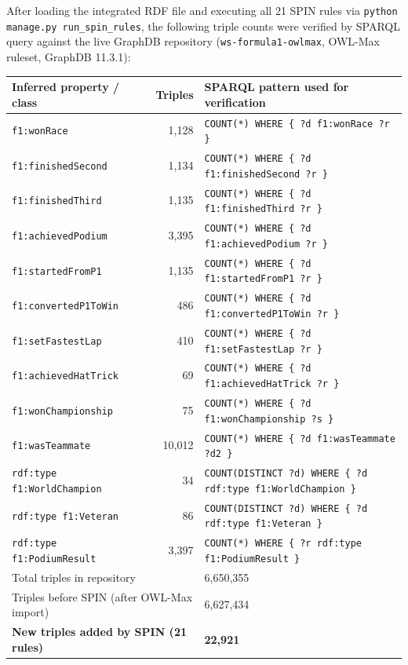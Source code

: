 \documentclass[12pt,a4paper]{article}
\begin{document}
After loading the integrated RDF file and executing all 21 SPIN rules via
\texttt{python manage.py run\_spin\_rules}, the following triple counts were
verified by SPARQL query against the live GraphDB repository
(\texttt{ws-formula1-owlmax}, OWL-Max ruleset, GraphDB 11.3.1):

\begin{center}
\begin{tabularx}{\linewidth}{@{}lrX@{}}
\toprule
\textbf{Inferred property / class} & \textbf{Triples} & \textbf{SPARQL pattern used for verification} \\
\midrule
\texttt{f1:wonRace}          & 1{,}128  & \texttt{COUNT(*) WHERE \{ ?d f1:wonRace ?r \}} \\
\texttt{f1:finishedSecond}   & 1{,}134  & \texttt{COUNT(*) WHERE \{ ?d f1:finishedSecond ?r \}} \\
\texttt{f1:finishedThird}    & 1{,}135  & \texttt{COUNT(*) WHERE \{ ?d f1:finishedThird ?r \}} \\
\texttt{f1:achievedPodium}   & 3{,}395  & \texttt{COUNT(*) WHERE \{ ?d f1:achievedPodium ?r \}} \\
\texttt{f1:startedFromP1}    & 1{,}135  & \texttt{COUNT(*) WHERE \{ ?d f1:startedFromP1 ?r \}} \\
\texttt{f1:convertedP1ToWin} & 486      & \texttt{COUNT(*) WHERE \{ ?d f1:convertedP1ToWin ?r \}} \\
\texttt{f1:setFastestLap}    & 410      & \texttt{COUNT(*) WHERE \{ ?d f1:setFastestLap ?r \}} \\
\texttt{f1:achievedHatTrick} & 69       & \texttt{COUNT(*) WHERE \{ ?d f1:achievedHatTrick ?r \}} \\
\texttt{f1:wonChampionship}  & 75       & \texttt{COUNT(*) WHERE \{ ?d f1:wonChampionship ?s \}} \\
\texttt{f1:wasTeammate}      & 10{,}012 & \texttt{COUNT(*) WHERE \{ ?d f1:wasTeammate ?d2 \}} \\
\midrule
\texttt{rdf:type f1:WorldChampion}   & 34      & \texttt{COUNT(DISTINCT ?d) WHERE \{ ?d rdf:type f1:WorldChampion \}} \\
\texttt{rdf:type f1:Veteran}         & 86      & \texttt{COUNT(DISTINCT ?d) WHERE \{ ?d rdf:type f1:Veteran \}} \\
\texttt{rdf:type f1:PodiumResult}    & 3{,}397 & \texttt{COUNT(*) WHERE \{ ?r rdf:type f1:PodiumResult \}} \\
\midrule
\multicolumn{2}{l}{Total triples in repository}              & 6{,}650{,}355 \\
\multicolumn{2}{l}{Triples before SPIN (after OWL-Max import)} & 6{,}627{,}434 \\
\multicolumn{2}{l}{\textbf{New triples added by SPIN (21 rules)}} & \textbf{22{,}921} \\
\bottomrule
\end{tabularx}
\end{center}
\end{document}
